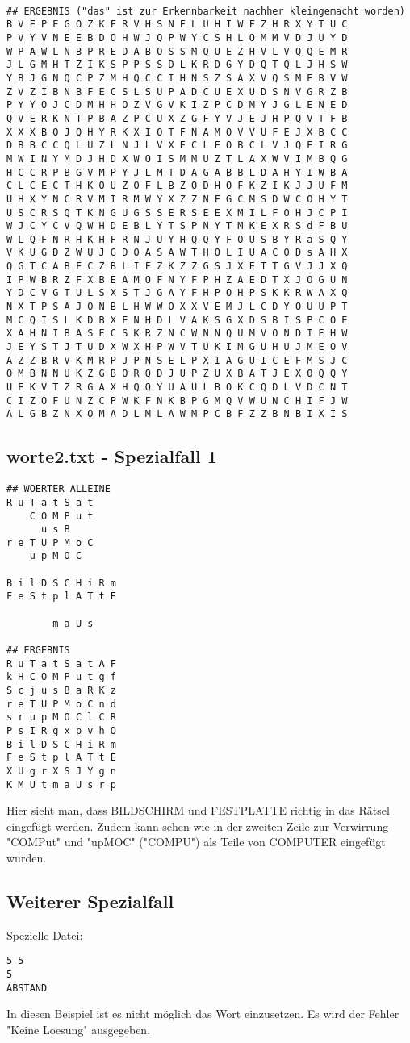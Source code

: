 \documentclass[a4paper,10pt,ngerman]{scrartcl}
\begin{document}
\begin{lstlisting}
                                                           
## ERGEBNIS ("das" ist zur Erkennbarkeit nachher kleingemacht worden)
B V E P E G O Z K F R V H S N F L U H I W F Z H R X Y T U C
P V Y V N E E B D O H W J Q P W Y C S H L O M M V D J U Y D
W P A W L N B P R E D A B O S S M Q U E Z H V L V Q Q E M R
J L G M H T Z I K S P P S S D L K R D G Y D Q T Q L J H S W
Y B J G N Q C P Z M H Q C C I H N S Z S A X V Q S M E B V W
Z V Z I B N B F E C S L S U P A D C U E X U D S N V G R Z B
P Y Y O J C D M H H O Z V G V K I Z P C D M Y J G L E N E D
Q V E R K N T P B A Z P C U X Z G F Y V J E J H P Q V T F B
X X X B O J Q H Y R K X I O T F N A M O V V U F E J X B C C
D B B C C Q L U Z L N J L V X E C L E O B C L V J Q E I R G
M W I N Y M D J H D X W O I S M M U Z T L A X W V I M B Q G
H C C R P B G V M P Y J L M T D A G A B B L D A H Y I W B A
C L C E C T H K O U Z O F L B Z O D H O F K Z I K J J U F M
U H X Y N C R V M I R M W Y X Z Z N F G C M S D W C O H Y T
U S C R S Q T K N G U G S S E R S E E X M I L F O H J C P I
W J C Y C V Q W H D E B L Y T S P N Y T M K E X R S d F B U
W L Q F N R H K H F R N J U Y H Q Q Y F O U S B Y R a S Q Y
V K U G D Z W U J G D O A S A W T H O L I U A C O D s A H X
Q G T C A B F C Z B L I F Z K Z Z G S J X E T T G V J J X Q
I P W B R Z F X B E A M O F N Y F P H Z A E D T X J O G U N
Y D C V G T U L S X S T J G A Y F H P O H P S K K R W A X Q
N X T P S A J O N B L H W W O X X V E M J L C D Y O U U P T
M C Q I S L K D B X E N H D L V A K S G X D S B I S P C O E
X A H N I B A S E C S K R Z N C W N N Q U M V O N D I E H W
J E Y S T J T U D X W X H P W V T U K I M G U H U J M E O V
A Z Z B R V K M R P J P N S E L P X I A G U I C E F M S J C
O M B N N U K Z G B O R Q D J U P Z U X B A T J E X O Q Q Y
U E K V T Z R G A X H Q Q Y U A U L B O K C Q D L V D C N T
C I Z O F U N Z C P W K F N K B P G M Q V W U N C H I F J W
A L G B Z N X O M A D L M L A W M P C B F Z Z B N B I X I S
\end{lstlisting}

\subsection{worte2.txt - Spezialfall 1}
\begin{lstlisting}
## WOERTER ALLEINE
R u T a t S a t    
    C O M P u t    
      u s B        
r e T U P M o C    
    u p M O C      
                   
B i l D S C H i R m
F e S t p l A T t E
                   
        m a U s    

## ERGEBNIS
R u T a t S a t A F
k H C O M P u t g f
S c j u s B a R K z
r e T U P M o C n d
s r u p M O C l C R
P s I R g x p v h O
B i l D S C H i R m
F e S t p l A T t E
X U g r X S J Y g n
K M U t m a U s r p
\end{lstlisting}
Hier sieht man, dass BILDSCHIRM und FESTPLATTE richtig in das Rätsel eingefügt werden.
Zudem kann sehen wie in der zweiten Zeile zur Verwirrung "COMPut" und "upMOC" ("COMPU") als Teile von COMPUTER
eingefügt wurden.\medskip
\subsection{Weiterer Spezialfall}
Spezielle Datei:
\begin{lstlisting}
5 5
5
ABSTAND
\end{lstlisting}
In diesen Beispiel ist es nicht möglich das Wort einzusetzen. Es wird der Fehler "Keine Loesung" ausgegeben.
\end{document}
